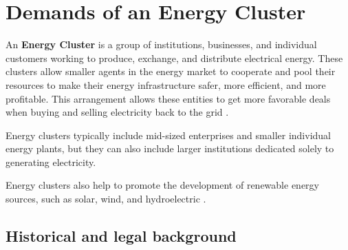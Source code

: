 \chapter{Demands of an Energy Cluster}
\label{ch:background}
\par An \textbf{Energy Cluster} is a group of institutions, businesses, and individual customers working to produce, exchange, and distribute electrical energy. These clusters allow smaller agents in the energy market to cooperate and pool their resources to make their energy infrastructure safer, more efficient, and more profitable. This arrangement allows these entities to get more favorable deals when buying and selling electricity back to the grid \citep{UwarunkowaniaRozwojuEnergetykiRozproszonej}. 
\par Energy clusters typically include mid-sized enterprises and smaller individual energy plants, but they can also include larger institutions dedicated solely to generating electricity. 
\par Energy clusters also help to promote the development of renewable energy sources, such as solar, wind, and hydroelectric \citep{UwarunkowaniaRozwojuEnergetykiRozproszonej}.

\section{Historical and legal background} 


